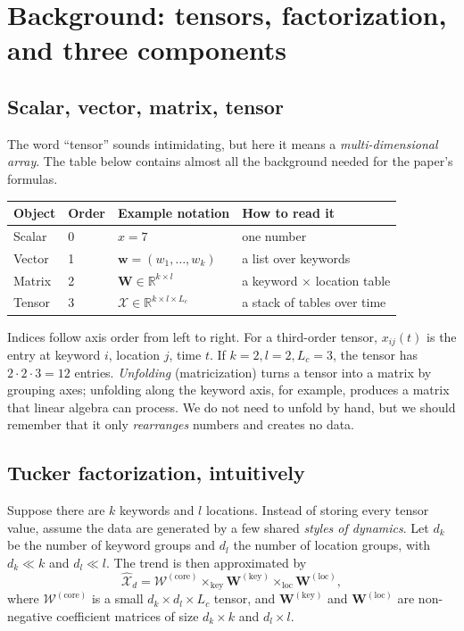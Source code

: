 \section{Background: tensors, factorization, and three components}
\label{sec:tensor-primer}

\subsection{Scalar, vector, matrix, tensor}

The word ``tensor'' sounds intimidating, but here it means a \emph{multi-dimensional array}. The
table below contains almost all the background needed for the paper's formulas.

\begin{center}
\small
\begin{tabular}{@{}llll@{}}
  \toprule
  Object & Order & Example notation & How to read it \\
  \midrule
  Scalar & 0 & $x=7$ & one number \\
  Vector & 1 & $\mathbf{w}=(w_1,\ldots,w_k)$ & a list over keywords \\
  Matrix & 2 & $\mathbf{W}\in\mathbb{R}^{k\times l}$ & a keyword $\times$ location table \\
  Tensor & 3 & $\mathcal{X}\in\mathbb{R}^{k\times l\times L_c}$ & a stack of tables over time \\
  \bottomrule
\end{tabular}
\end{center}

Indices follow axis order from left to right. For a third-order tensor, $x_{ij}(t)$ is the entry at
keyword $i$, location $j$, time $t$. If $k=2,l=2,L_c=3$, the tensor has $2\cdot2\cdot3=12$ entries.
\emph{Unfolding} (matricization) turns a tensor into a matrix by grouping axes; unfolding along the
keyword axis, for example, produces a matrix that linear algebra can process. We do not need to
unfold by hand, but we should remember that it only \emph{rearranges} numbers and creates no data.

\subsection{Tucker factorization, intuitively}

Suppose there are $k$ keywords and $l$ locations. Instead of storing every tensor value, assume the
data are generated by a few shared \emph{styles of dynamics}. Let $d_k$ be the number of keyword
groups and $d_l$ the number of location groups, with $d_k\ll k$ and $d_l\ll l$. The trend is then
approximated by
\begin{equation}
  \widehat{\mathcal{X}}_d
  =\mathcal{W}^{(\mathrm{core})}
   \times_{\mathrm{key}}\mathbf{W}^{(\mathrm{key})}
   \times_{\mathrm{loc}}\mathbf{W}^{(\mathrm{loc})},
  \label{eq:tucker-intuition}
\end{equation}
where $\mathcal{W}^{(\mathrm{core})}$ is a small $d_k\times d_l\times L_c$ tensor, and
$\mathbf{W}^{(\mathrm{key})}$ and $\mathbf{W}^{(\mathrm{loc})}$ are non-negative coefficient
matrices of size $d_k\times k$ and $d_l\times l$.

